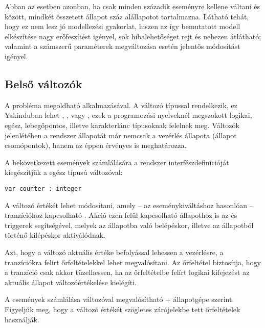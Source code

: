 Abban az esetben azonban, ha csak minden századik eseményre kellene váltani  és  között, mindkét összetett állapot száz alállapotot tartalmazna. Látható tehát, hogy ez nem lesz jó modellezési gyakorlat, hiszen az így bemutatott modell elkészítése nagy erőfeszítést igényel, sok hibalehetőséget rejt és nehezen átlátható; valamint a számszerű paraméterek megváltozása esetén jelentős módosítást igényel.

\subsection{Belső változók}

A probléma megoldható  alkalmazásával. A változó típussal rendelkezik, ez Yakinduban lehet , ,  vagy , ezek a programozási nyelveknél megszokott logikai, egész, lebegőpontos, illetve karakterlánc típusoknak felelnek meg. Változók jelenlétében a rendszer állapotát már nemcsak a vezérlés állapota (állapot csomópontok), hanem az éppen érvényes  is meghatározza.

\begin{pelda}
A bekövetkezett  események számlálására a rendszer interfészdefinícióját kiegészítjük a  egész típusú változóval:

\begin{minipage}{\linewidth}
\begin{lstlisting}
var counter : integer
\end{lstlisting}
\end{minipage}
\end{pelda}

A változó értékét  lehet módosítani, amely -- az eseménykiváltáshoz hasonlóan -- tranzícióhoz kapcsolható . Akció ezen felül kapcsolható állapothoz is az  és  triggerek segítségével, melyek az állapotba való belépéskor, illetve az állapotból történő kilépéskor aktiválódnak. %

Azt, hogy a változó aktuális értéke befolyással lehessen a vezérlésre, a tranzíciókra felírt őrfeltételekkel lehet megvalósítani. Az őrfeltétel biztosítja, hogy a tranzíció csak akkor tüzelhessen, ha az őrfeltételbe felírt logikai kifejezést az aktuális állapot változóértékelése kielégíti.

\begin{pelda}
A  események számlálása változóval megvalósítható \az+ állapotgépe szerint. Figyeljük meg, hogy a változó értékét szögletes zárójelekbe tett őrfeltételek használják.
\end{pelda}


